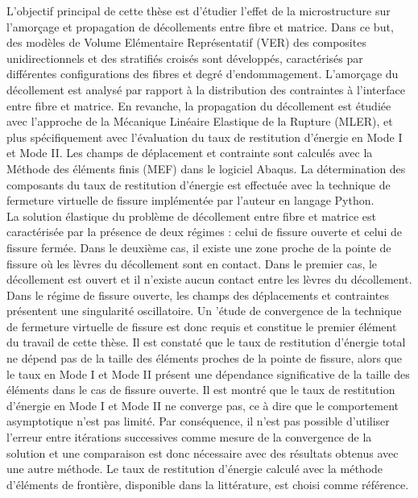 L'objectif principal de cette th\`ese est d'\'etudier l'effet de la microstructure sur l'amor\c{c}age et propagation de d\'ecollements entre fibre et matrice. Dans ce but, des mod\`eles de Volume El\'ementaire Repr\'esentatif (VER) des composites unidirectionnels et des stratifi\'es crois\'es sont d\'evelopp\'es, caract\'eris\'es par diff\'erentes configurations des fibres et degr\'e d'endommagement. L'amor\c{c}age du d\'ecollement est analys\'e par rapport \`a la distribution des contraintes \`a l'interface entre fibre et matrice. En revanche, la propagation du d\'ecollement est \'etudi\'ee avec l'approche de la M\'ecanique Lin\'eaire Elastique de la Rupture (MLER), et plus sp\'ecifiquement avec l'\'evaluation du taux de restitution d'\'energie en Mode I et Mode II. Les champs de d\'eplacement et contrainte sont calcul\'es avec la M\'ethode des \'el\'ements finis (MEF) dans le logiciel Abaqus. La d\'etermination des composants du taux de restitution d'\'energie est effectu\'ee avec la technique de fermeture virtuelle de fissure impl\'ement\'ee par l'auteur en langage Python.\\

La solution \'elastique du probl\`eme de d\'ecollement entre fibre et matrice est caract\'eris\'ee par la pr\'esence de deux r\'egimes : celui de fissure ouverte et celui de fissure ferm\'ee. Dans le deuxi\`eme cas, il existe une zone proche de la pointe de fissure o\`u les l\`evres du d\'ecollement sont en contact. Dans le premier cas, le d\'ecollement est ouvert et il n'existe aucun contact entre les l\`evres du d\'ecollement. Dans le r\'egime de fissure ouverte, les champs des d\'eplacements et contraintes pr\'esentent une singularit\'e oscillatoire. Un '\'etude de convergence de la technique de fermeture virtuelle de fissure est donc requis et constitue le premier \'el\'ement du travail de cette th\`ese. Il est constat\'e que le taux de restitution d'\'energie total ne d\'epend pas de la taille des \'el\'ements proches de la pointe de fissure, alors que le taux en Mode I et Mode II pr\'esent une d\'ependance significative de la taille des \'el\'ements dans le cas de fissure ouverte. Il est montr\'e que le taux de restitution d'\'energie en Mode I et Mode II ne converge pas, ce \`a dire que le comportement asymptotique n'est pas limit\'e. Par cons\'equence, il n'est pas possible d'utiliser l'erreur entre it\'erations successives comme mesure de la convergence de la solution et une comparaison est donc n\'ecessaire avec des r\'esultats obtenus avec une autre m\'ethode. Le taux de restitution d'\'energie calcul\'e avec la m\'ethode d'\'el\'ements de fronti\`ere, disponible dans la litt\'erature, est choisi comme r\'ef\'erence.\\

